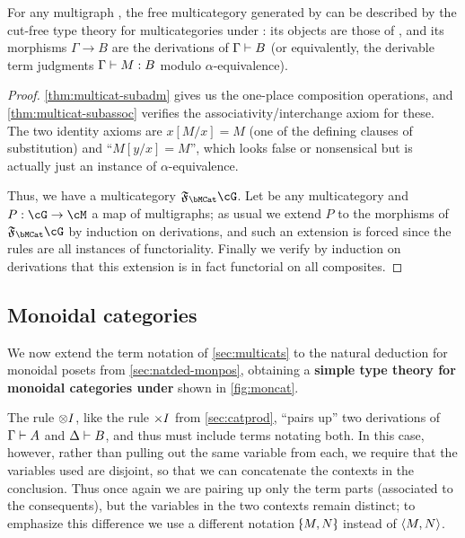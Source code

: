 \begin{thm}\label{thm:multicat-initial}
  For any multigraph \cG, the free multicategory generated by \cG can be described by the cut-free type theory for multicategories under \cG: its objects are those of \cG, and its morphisms $\Gamma\to B$ are the derivations of $\Gamma\vdash B$ (or equivalently, the derivable term judgments $\Gamma\vdash M:B$ modulo $\alpha$-equivalence).
\end{thm}
\begin{proof}
  \cref{thm:multicat-subadm} gives us the one-place composition operations, and \cref{thm:multicat-subassoc} verifies the associativity/interchange axiom for these.
  The two identity axioms are $x[M/x]=M$ (one of the defining clauses of substitution) and ``$M[y/x] = M$'', which looks false or nonsensical but is actually just an instance of $\alpha$-equivalence.

  Thus, we have a multicategory $\F\bMCat\cG$.
  Let \cM be any multicategory and $P:\cG\to\cM$ a map of multigraphs; as usual we extend $P$ to the morphisms of $\F\bMCat\cG$ by induction on derivations, and such an extension is forced since the rules are all instances of functoriality.
  Finally we verify by induction on derivations that this extension is in fact functorial on all composites.
\end{proof}


\subsection{Monoidal categories}
\label{sec:moncat}

We now extend the term notation of \cref{sec:multicats} to the natural deduction for monoidal posets from \cref{sec:natded-monpos}, obtaining a \textbf{simple type theory for monoidal categories under \cG} shown in \cref{fig:moncat}.

The rule $\mathord{\otimes}I$, like the rule $\timesI$ from \cref{sec:catprod}, ``pairs up'' two derivations of $\Gamma\vdash A$ and $\Delta\vdash B$, and thus must include terms notating both.
In this case, however, rather than pulling out the same variable from each, we require that the variables used are disjoint, so that we can concatenate the contexts in the conclusion.
Thus once again we are pairing up only the term parts (associated to the consequents), but the variables in the two contexts remain distinct; to emphasize this difference we use a different notation $\tpair M N$ instead of $\langle M,N\rangle$.

